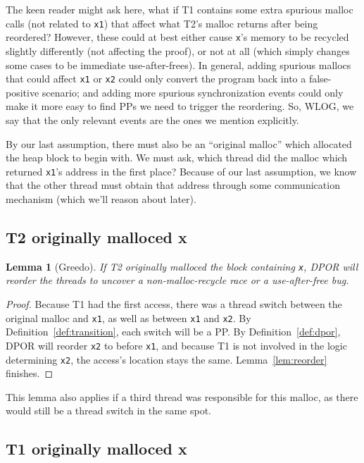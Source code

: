 \documentclass[pldi]{sigplanconf-pldi15}
\newtheorem{lemma}{Lemma}
\begin{document}
The keen reader might ask here, what if T1 contains some extra spurious malloc calls (not related to {\tt x1}) that affect what T2's malloc returns after being reordered?
However, these could at best either cause {\tt x}'s memory to be recycled slightly differently (not affecting the proof), or not at all (which simply changes some cases to be immediate use-after-frees).
In general, adding spurious mallocs that could affect {\tt x1} or {\tt x2} could only convert the program back into a false-positive scenario;
and adding more spurious synchronization events could only make it more easy to find PPs we need to trigger the reordering.
So, WLOG, we say that the only relevant events are the ones we mention explicitly.

By our last assumption, there must also be an ``original malloc'' which allocated the heap block to begin with.
We must ask, which thread did the malloc which returned {\tt x1}'s address in the first place?
Because of our last assumption, we know that the other thread must obtain that address through some communication mechanism (which we'll reason about later).

\subsection{T2 originally malloced x}

\begin{lemma}[Greedo]
	If T2 originally malloced the block containing {\tt x}, DPOR will reorder the threads to uncover a non-malloc-recycle race or a use-after-free bug.
	\label{lem:greedo}
\end{lemma}
\begin{proof}
Because T1 had the first access, there was a thread switch between the original malloc and {\tt x1}, as well as between {\tt x1} and {\tt x2}. By Definition~\ref{def:transition}, each switch will be a PP.
By Definition~\ref{def:dpor}, DPOR will reorder {\tt x2} to before {\tt x1},
and because T1 is not involved in the logic determining {\tt x2}, the access's location stays the same.
Lemma~\ref{lem:reorder} finishes.
\end{proof}

This lemma also applies if a third thread was responsible for this malloc, as there would still be a thread switch in the same spot.

\subsection{T1 originally malloced x}
\end{document}
